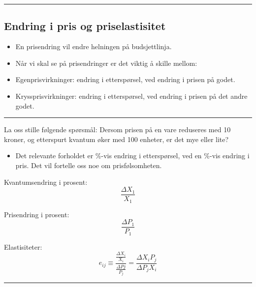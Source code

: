 \documentclass[
  letterpaper,
  DIV=11,
  numbers=noendperiod]{scrartcl}
\providecommand{\tightlist}{%
  \setlength{\itemsep}{0pt}\setlength{\parskip}{0pt}}\usepackage{longtable,booktabs,array}
\begin{document}
\begin{center}\rule{0.5\linewidth}{0.5pt}\end{center}

\subsection{Endring i pris og
priselastisitet}\label{endring-i-pris-og-priselastisitet}

\begin{itemize}
\tightlist
\item
  En prisendring vil endre helningen på budsjettlinja.
\item
  Når vi skal se på prisendringer er det viktig å skille mellom:
\item
  Egenprisvirkninger: endring i etterspørsel, ved endring i prisen på
  godet.
\item
  Kryssprisvirkninger: endring i etterspørsel, ved endring i prisen på
  det andre godet.
\end{itemize}

\begin{center}\rule{0.5\linewidth}{0.5pt}\end{center}

La oss stille følgende spørsmål: Dersom prisen på en vare reduseres med
10 kroner, og etterspurt kvantum øker med 100 enheter, er det mye eller
lite?

\begin{itemize}
\tightlist
\item
  Det relevante forholdet er \%-vis endring i etterspørsel, ved en
  \%-vis endring i pris. Det vil fortelle oss noe om prisfølsomheten.
\end{itemize}

Kvantumsendring i prosent: \begin{equation*}
\frac{\Delta X_{1}}{X_{1}}
\end{equation*}

Prisendring i prosent: \begin{equation*}
\frac{\Delta P_{1}}{P_{1}}
\end{equation*}

Elastisiteter: \begin{equation*}
e_{ij} \equiv \frac{\frac{\Delta X_{i}}{X_{i}}}{\frac{\Delta P{j}}{P_{j}}}=\frac{\Delta X_{i} P_{j} }{\Delta P_{j} X_{i}}
\end{equation*}

\begin{center}\rule{0.5\linewidth}{0.5pt}\end{center}
\end{document}
